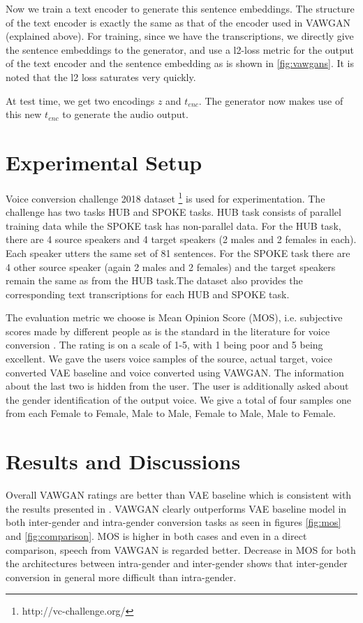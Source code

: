 \documentclass[letterpaper]{article}
\begin{document}
Now we train a text encoder to generate this sentence embeddings. The structure of the text encoder is exactly the same as that of the encoder used in VAWGAN (explained above). For training, since we have the transcriptions, we directly give the sentence embeddings to the generator, and use a l2-loss metric for the output of the text encoder and the sentence embedding as is shown in \ref{fig:vawgans}. It is noted that the l2 loss saturates very quickly. 

At test time, we get two encodings $z$ and $t_{enc}$. The generator now makes use of this new $t_{enc}$ to generate the audio output. 


\section{Experimental Setup}

Voice conversion challenge 2018 dataset \footnote{http://vc-challenge.org/} is used for experimentation. The challenge has two tasks HUB and SPOKE tasks. HUB task consists of parallel training data while the SPOKE task has non-parallel data. For the HUB task, there are 4 source speakers and 4 target speakers (2 males and 2 females in each). Each speaker utters the same set of 81 sentences. For the SPOKE task there are 4 other source speaker (again 2 males and 2 females) and the target speakers remain the same as from the HUB task.The dataset also provides the corresponding text transcriptions for each HUB and SPOKE task. 

The evaluation metric we choose is Mean Opinion Score (MOS), i.e. subjective scores made by different people as is the standard in the literature for voice conversion \cite{vawgan}. The rating is on a scale of 1-5, with 1 being poor and 5 being excellent. We gave the users voice samples of the source, actual target, voice converted VAE baseline and voice converted using VAWGAN. The information about the last two is hidden from the user. The user is additionally asked about the gender identification of the output voice. We give a total of four samples one from each Female to Female, Male to Male, Female to Male, Male to Female.

\section{Results and Discussions}

Overall VAWGAN ratings are better than VAE baseline which is consistent with the results presented in \cite{vawgan}. VAWGAN clearly outperforms VAE baseline model in both inter-gender and intra-gender conversion tasks as seen in figures \ref{fig:mos} and \ref{fig:comparison}. MOS is higher in both cases and even in a direct comparison, speech from VAWGAN is regarded better. Decrease in MOS for both the architectures between intra-gender and inter-gender shows that inter-gender conversion in general more difficult than intra-gender. 
 
\end{document}
